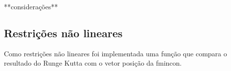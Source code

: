 


**considerações**

\subsection{Restrições não lineares}
Como restrições não lineares foi implementada uma função que compara
o resultado do Runge Kutta com o vetor posição da fmincon.







    
    

    

    
    
    
